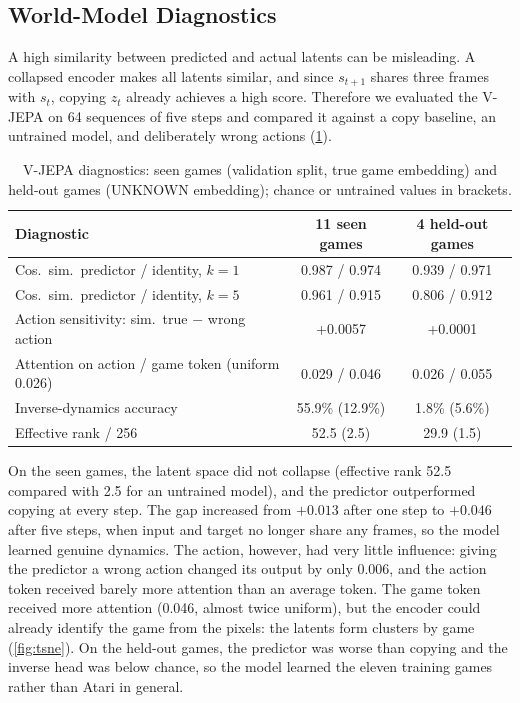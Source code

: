 \documentclass[runningheads]{llncs}
\begin{document}
\FloatBarrier
\subsection{World-Model Diagnostics}
\label{sec:jepa-diag}

A high similarity between predicted and actual latents can be misleading. A collapsed encoder
makes all latents similar, and since $s_{t+1}$ shares three frames with $s_t$, copying $z_t$
already achieves a high score. Therefore we evaluated the V-JEPA on 64 sequences of five steps
and compared it against a copy baseline, an untrained model, and deliberately wrong actions
(\cref{tab:jepa}).

\begin{table}[!htbp]
\centering
\caption{V-JEPA diagnostics: seen games (validation split, true game embedding) and held-out
games (UNKNOWN embedding); chance or untrained values in brackets.}
\label{tab:jepa}
\footnotesize\setlength{\tabcolsep}{4pt}
\begin{tabular}{@{}lcc@{}}
\toprule
Diagnostic & 11 seen games & 4 held-out games \\
\midrule
Cos.\ sim.\ predictor / identity, $k=1$ & 0.987 / 0.974 & 0.939 / 0.971 \\
Cos.\ sim.\ predictor / identity, $k=5$ & 0.961 / 0.915 & 0.806 / 0.912 \\
Action sensitivity: sim.\ true $-$ wrong action & +0.0057 & +0.0001 \\
Attention on action / game token (uniform 0.026) & 0.029 / 0.046 & 0.026 / 0.055 \\
Inverse-dynamics accuracy & 55.9\% (12.9\%) & 1.8\% (5.6\%) \\
Effective rank / 256 & 52.5 (2.5) & 29.9 (1.5) \\
\bottomrule
\end{tabular}
\end{table}

On the seen games, the latent space did not collapse (effective rank 52.5 compared with 2.5 for
an untrained model), and the predictor outperformed copying at every step. The gap increased
from $+0.013$ after one step to $+0.046$ after five steps, when input and target no longer share any frames, so the model learned genuine dynamics. The action, however, had very little influence: giving the predictor a wrong action changed its output by
only 0.006, and the action token received barely more attention than an average token. The
game token received more attention (0.046, almost twice uniform), but the encoder could already
identify the game from the pixels: the latents form clusters by game (\cref{fig:tsne}). On the
held-out games, the predictor was worse than copying and the inverse head was below
chance, so the model learned the eleven training games rather than Atari in general.
\end{document}
